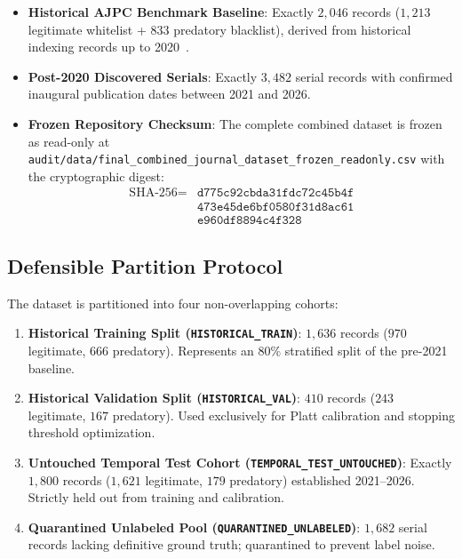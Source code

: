 \documentclass[journal]{IEEEtran}
\begin{document}
\begin{itemize}
    \item \textbf{Historical AJPC Benchmark Baseline}: Exactly $2,046$ records ($1,213$ legitimate whitelist + $833$ predatory blacklist), derived from historical indexing records up to 2020~\cite{chen2023open}.
    \item \textbf{Post-2020 Discovered Serials}: Exactly $3,482$ serial records with confirmed inaugural publication dates between 2021 and 2026.
    \item \textbf{Frozen Repository Checksum}: The complete combined dataset is frozen as read-only at \texttt{audit/data/final\_combined\_journal\_dataset\_frozen\_readonly.csv} with the cryptographic digest:
    \begin{equation}
    \begin{aligned}
    \text{SHA-256} = {} & \mathtt{d775c92cbda31fdc72c45b4f} \\
    & \mathtt{473e45de6bf0580f31d8ac61} \\
    & \mathtt{e960df8894c4f328}
    \end{aligned}
    \end{equation}
\end{itemize}

\subsection{Defensible Partition Protocol}
The dataset is partitioned into four non-overlapping cohorts:
\begin{enumerate}
    \item \textbf{Historical Training Split (\texttt{HISTORICAL\_TRAIN})}: $1,636$ records ($970$ legitimate, $666$ predatory). Represents an $80\%$ stratified split of the pre-2021 baseline.
    \item \textbf{Historical Validation Split (\texttt{HISTORICAL\_VAL})}: $410$ records ($243$ legitimate, $167$ predatory). Used exclusively for Platt calibration and stopping threshold optimization.
    \item \textbf{Untouched Temporal Test Cohort (\texttt{TEMPORAL\_TEST\_UNTOUCHED})}: Exactly $1,800$ records ($1,621$ legitimate, $179$ predatory) established 2021--2026. Strictly held out from training and calibration.
    \item \textbf{Quarantined Unlabeled Pool (\texttt{QUARANTINED\_UNLABELED})}: $1,682$ serial records lacking definitive ground truth; quarantined to prevent label noise.
\end{enumerate}
\end{document}
